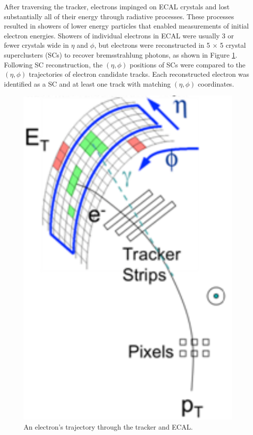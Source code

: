 After traversing the tracker, electrons impinged on ECAL crystals and lost substantially all of their 
energy through radiative processes.  These processes resulted in showers of lower energy particles 
that enabled measurements of initial electron energies.  Showers of individual electrons in ECAL were usually 
3 or fewer crystals wide in $\eta$ and $\phi$, but electrons were reconstructed in 5 $\times$ 5 crystal 
superclusters (SCs) to recover bremsstrahlung photons, as shown in Figure \ref{fig:eleTrackAndSC}.  Following 
SC reconstruction, the $(\eta, \phi)$ positions of SCs were compared to 
the $(\eta, \phi)$ trajectories of electron candidate tracks.  Each reconstructed electron was identified 
as a SC and at least one track with matching $(\eta, \phi)$ coordinates.

\begin{figure}[h]
	\centering
	\includegraphics[width=1.0\textwidth]{figures/electronTrackAndSupercluster.png}
	\caption{An electron's trajectory through the tracker and ECAL.}
	\label{fig:eleTrackAndSC}
\end{figure}


